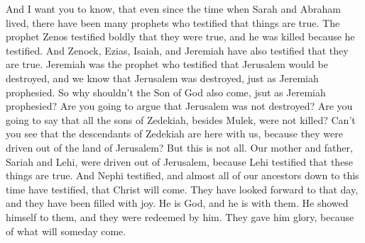 \bverse \iffalse And now I would that ye should know, that even since the days of Abraham there have been many prophets that have testified these things; yea, behold, the prophet Zenos did testify boldly; for the which he was slain. \fi
And I want you to know, that even since the time when Sarah and Abraham lived, there have been many prophets who testified that things are true. The prophet Zenos testified boldly that they were true, and he was killed because he testified.
\bverse \iffalse And behold, also Zenock, and also Ezias, and also Isaiah, and Jeremiah, (Jeremiah being that same prophet who testified of the destruction of Jerusalem) and now we know that Jerusalem was destroyed according to the words of Jeremiah. O then why not the Son of God come, according to his prophecy? \fi
And Zenock, Ezias, Isaiah, and Jeremiah have also testified that they are true. Jeremiah was the prophet who testified that Jerusalem would be destroyed, and we know that Jerusalem was destroyed, just as Jeremiah prophesied. So why shouldn't the Son of God also come, jsut as Jeremiah prophesied?
\bverse \iffalse And now will you dispute that Jerusalem was destroyed? Will ye say that the sons of Zedekiah were not slain, all except it were Mulek? Yea, and do ye not behold that the seed of Zedekiah are with us, and they were driven out of the land of Jerusalem?  But behold, this is not all-- \fi
Are you going to argue that Jerusalem was not destroyed? Are you going to say that all the sons of Zedekiah, besides Mulek, were not killed? Can't you see that the descendants of Zedekiah are here with us, because they were driven out of the land of Jerusalem? But this is not all.
\bverse \iffalse Our father Lehi was driven out of Jerusalem because he testified of these things. Nephi also testified of these things, and also almost all of our fathers, even down to this time; yea, they have testified of the coming of Christ, and have looked forward, and have rejoiced in his day which is to come. \fi
Our mother and father, Sariah and Lehi, were driven out of Jerusalem, because Lehi testified that these things are true. And Nephi testified, and almost all of our ancestors down to this time have testified, that Christ will come. They have looked forward to that day, and they have been filled with joy.
\bverse \iffalse And behold, he is God, and he is with them, and he did manifest himself unto them, that they were redeemed by him; and they gave unto him glory, because of that which is to come. \fi
He is God, and he is with them. He showed himself to them, and they were redeemed by him. They gave him glory, because of what will someday come.
